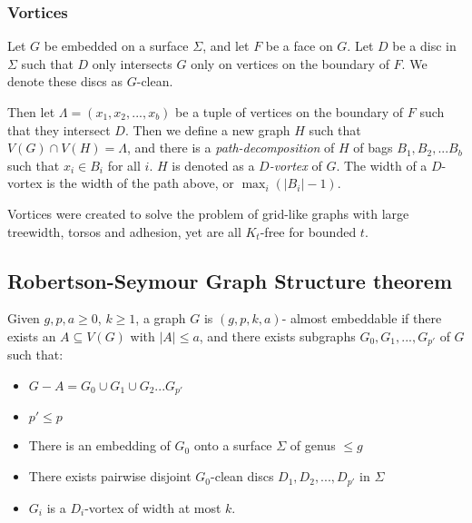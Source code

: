 \documentclass[]{report}
\theoremstyle{definition}
\numberwithin{theorem}{section}
\numberwithin{equation}{section}
\begin{document}
\subsubsection{Vortices}\label{sssec:vortices}
Let $G$ be embedded on a surface $\Sigma$, and let $F$ be a face on $G$. Let $D$ be a disc in $\Sigma$ such that $D$ only intersects $G$ only on vertices on the boundary of $F$. We denote these discs as $G$-clean. 

Then let $\Lambda = (x_1, x_2, ..., x_b)$ be a tuple of vertices on the boundary of $F$ such that they intersect $D$. Then we define a new graph $H$ such that $V(G) \cap V(H) = \Lambda$, and there is a \textit{path-decomposition} of $H$ of bags $B_1, B_2, ... B_b$ such that $x_i \in B_i$ for all $i$. $H$ is denoted as a \textit{$D$-vortex} of $G$. The width of a $D$-vortex is the width of the path above, or $\max_i(|B_i| - 1)$. 

Vortices were created to solve the problem of grid-like graphs with large treewidth, torsos and adhesion, yet are all $K_t$-free for bounded $t$. 
\subsection{Robertson-Seymour Graph Structure theorem\cite{robertsonGraphMinorsXVI2003}}\label{ssec:Robertson_Seymour_Graph_Structure}
Given $g, p, a \geq 0$, $k \geq 1$, a graph $G$ is $(g, p, k, a)$- almost embeddable if there exists an $A \subseteq V(G)$ with $|A| \leq a$, and there exists subgraphs $G_0, G_1, ...,  G_{p'}$ of $G$ such that:
\begin{itemize}
	\item $G - A = G_0 \cup G_1 \cup G_2 ... G_{p'}$
	\item $p' \leq p$
	\item There is an embedding of $G_0$ onto a surface $\Sigma$ of genus $\leq g$
	\item There exists pairwise disjoint $G_0$-clean discs $D_1, D_2, ..., D_{p'}$ in $\Sigma$
	\item $G_i$ is a $D_i$-vortex of width at most $k$.
\end{itemize}
\end{document}
